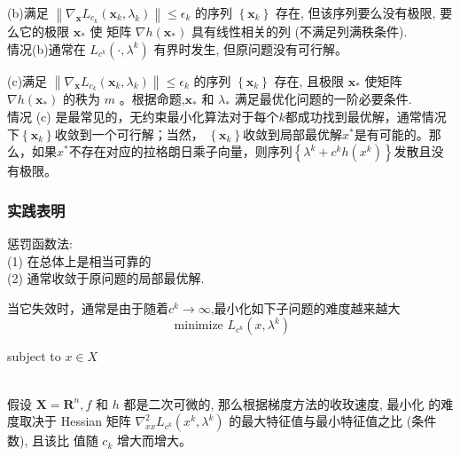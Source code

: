 \documentclass[handout,10pt]{beamer} %
\begin{document}
\begin{frame}

\qquad (b)满足 $\left\|\nabla_{\mathbf{x}} L_{c_k}\left(\boldsymbol{x}_k, \lambda_k\right)\right\| \leqslant \epsilon_k$ 的序列 $\left\{\boldsymbol{x}_k\right\}$ 存在, 但该序列要么没有极限, 要么它的极限 $\boldsymbol{x}_*$ 使 矩阵 $\nabla h\left(\boldsymbol{x}_*\right)$ 具有线性相关的列 (不满足列满秩条件).\\
\qquad 情况(b)通常在 $L_{c^{k}}\left(\cdot, \lambda^{k}\right)$ 有界时发生, 但原问题没有可行解。
\end{frame}

\begin{frame}

\qquad (c)满足 $\left\|\nabla_{\mathbf{x}} L_{c_k}\left(\boldsymbol{x}_k, \lambda_k\right)\right\| \leqslant \epsilon_k$ 的序列 $\left\{\boldsymbol{x}_k\right\}$ 存在, 且极限 $\boldsymbol{x}_*$ 使矩阵 $\nabla h\left(\boldsymbol{x}_*\right)$ 的秩为 $m$ 。根据命题,$ \boldsymbol{x}_*$ 和 $\lambda_*$ 满足最优化问题的一阶必要条件.\\
\qquad 情况 (c) 是最常见的，无约束最小化算法对于每个$k$都成功找到最优解，通常情况下$\left\{\boldsymbol{x}_k\right\}$收敛到一个可行解；当然， $\left\{\boldsymbol{x}_k\right\}$收敛到局部最优解$x^{*}$是有可能的。那么，如果$x^{*}$不存在对应的拉格朗日乘子向量，则序列$\left\{\lambda^{k}+c^{k} h\left(x^{k}\right)\right\}$发散且没有极限。
\end{frame}

\begin{frame}
\frametitle{实践表明}
惩罚函数法:\\
\qquad (1) 在总体上是相当可靠的\\
\qquad (2) 通常收敛于原问题的局部最优解.\\

\end{frame}

\begin{frame}
当它失效时，通常是由于随着$c^{k} \rightarrow \infty$,最小化如下子问题的难度越来越大
$$
\text { minimize } L_{c^{k}}\left(x, \lambda^{k}\right)
$$
\centerline{subject to $x \in X$}
\\
\qquad  假设 $\boldsymbol{X}=\mathbf{R}^n, f$ 和 $h$ 都是二次可微的, 那么根据梯度方法的收玫速度, 最小化 的难度取决于 Hessian 矩阵  $\nabla_{x x}^{2} L_{c^{k}}\left(x^{k}, \lambda^{k}\right)$ 的最大特征值与最小特征值之比 (条件数), 且该比 值随 $c_k$ 增大而增大。
\end{frame}
\end{document}
